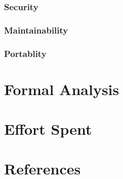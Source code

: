 \documentclass[12pt,a4paper]{report}
\begin{document}
		\subsection{Security}
		\subsection{Maintainability}
		\subsection{Portablity}

\chapter{Formal Analysis}

\chapter{Effort Spent}

\chapter{References}
\end{document}
